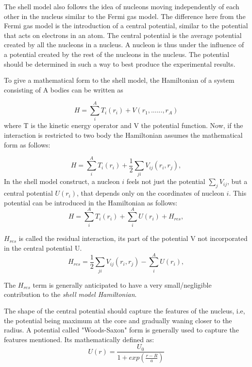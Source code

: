 \documentclass[a4paper,12pt,twoside]{report}
\begin{document}
The shell model also follows the idea of nucleons moving independently of each other in the nucleus similar to the Fermi gas model. The difference here from the Fermi gas model is the introduction of a central potential, similar to the potential that acts on electrons in an atom. The central potential is the average potential created by all the nucleons in a nucleus. A nucleon is thus under the influence of a potential created by the rest of the nucleons in the nucleus. The potential should be determined in such a way to best produce the experimental results.

To give a mathematical form to the shell model, the Hamiltonian of a system consisting of A bodies can be written as

\begin{equation}
    H = \sum_{i}^{A} T_{i}(r_{i}) + V(r_{1},......,r_{A})
\end{equation}
 where T is the kinetic energy operator and V the potential function.
 Now, if the interaction is restricted to two body the Hamiltonian assumes the mathematical form as follows:
 
\begin{equation}
    H = \sum_{i}^{A} T_{i}(r_{i}) + \frac{1}{2}\sum_{ji}^{}V_{ij}(r_{i},r_{j}),
\end{equation}
In the shell model construct, a nucleon $\textit{i}$ feels not just the potential $\sum_{j}^{}V_{ij}$, but a central potential $U(r_{i})$, that depends only on the coordinates of nucleon $\textit{i}$. This potential can be introduced in the Hamiltonian as follows:
\begin{equation}
    H = \sum_{i}^{A} T_{i}(r_{i}) + \sum_{i}^{A}U(r_{i}) + H_{res},
\end{equation}
    
$H_{res}$ is called the residual interaction, its part of the potential V not incorporated in the central potential U.
\begin{equation}
    H_{res} = \frac{1}{2}\sum_{ji}^{}V_{ij}(r_{i},r_{j}) - \sum_{i}^{A}U(r_{i}),
\end{equation}

The $H_{res}$ term is generally anticipated to have a very small/negligible contribution to the \textit{shell model Hamiltonian}. 

The shape of the central potential should capture the features of the nucleus, i.e, the potential being maximum at the core and gradually waning closer to the radius. A potential called "Woods-Saxon" form is generally used to capture the features mentioned. Its mathematically defined as:
\begin{equation}
    U(r) = \frac{U_{0}}{1+exp(\frac{r-R}{a})} 
\end{equation}
\end{document}

